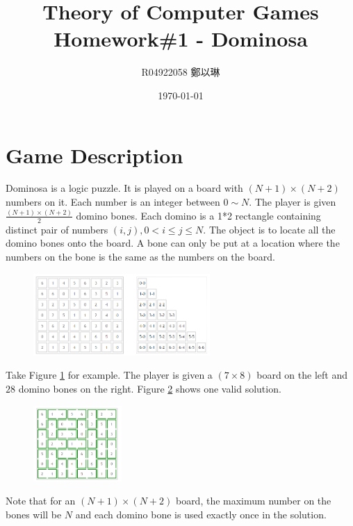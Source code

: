 \documentclass[12pt]{article}
\title{\textbf{Theory of Computer Games}\\ Homework\#1 - Dominosa}
\author{R04922058 鄭以琳}
\date{\large \today}
\begin{document}
\maketitle

\section{Game Description}
Dominosa is a logic puzzle. It is played on a board with $(N+1)\times(N+2)$ numbers on it. Each number is an integer between $0\sim N$. The player is given $\frac{(N+1)\times(N+2)}{2}$ domino bones. Each domino is a 1*2 rectangle containing distinct pair of numbers $(i,j), 0<i\leq j\leq N$. The object is to locate all the domino bones onto the board. A bone can only be put at a location where the numbers on the bone is the same as the numbers on the board.

	\begin{figure}[H]
	\centering
	\includegraphics[width=0.6\textwidth]{fig_description1}
	\caption[Caption for the list of figures]{}
	\label{fig:description1}
	\end{figure}

Take Figure \ref{fig:description1} for example. The player is given a $(7\times8)$ board on the left and $28$ domino bones on the right. Figure \ref{fig:description2} shows one valid solution.

	\begin{figure}[H]
	\centering
	\includegraphics[width=0.3\textwidth]{fig_description2}
	\caption[Caption for the list of figures]{}
	\label{fig:description2}
	\end{figure}

Note that for an $(N+1)\times(N+2)$ board, the maximum number on the bones will be $N$ and each domino bone is used exactly once in the solution.\\
\end{document}
